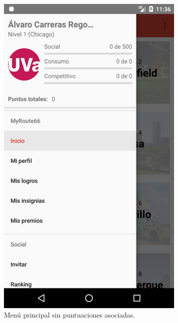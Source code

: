 \documentclass[twoside]{report}
\begin{document}
\begin{figure}[H]
\begin{center}
	\begin{subfigure}[t]{.3\linewidth}
		\includegraphics[scale=0.2]{images/userguide/2.png}
		\caption{Menú principal sin puntuaciones asociadas.}
	\end{subfigure}\hspace{3mm}%
	\begin{subfigure}[t]{.3\linewidth}

\end{subfigure}
\end{center}
\end{figure}
\end{document}
